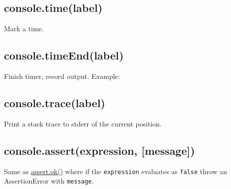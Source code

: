 \subsection{console.time(label)}\label{console.timelabel}

Mark a time.

\subsection{console.timeEnd(label)}\label{console.timeendlabel}

Finish timer, record output. Example:

\begin{Shaded}
\begin{Highlighting}[]
\NormalTok{(}\NormalTok{);}
 \NormalTok{(} 
  \NormalTok{;}
\NormalTok{\}}
\NormalTok{(}\NormalTok{);}
\end{Highlighting}
\end{Shaded}

\subsection{console.trace(label)}\label{console.tracelabel}

Print a stack trace to stderr of the current position.

\subsection{console.assert(expression,
{[}message{]})}\label{console.assertexpression-message}

Same as
\href{assert.html\#assert_assert_value_message_assert_ok_value_message}{assert.ok()}
where if the \texttt{expression} evaluates as \texttt{false} throw an
AssertionError with \texttt{message}.
